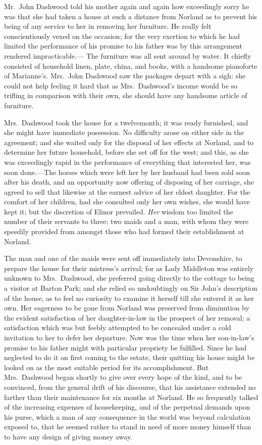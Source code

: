 \documentclass{article}
\begin{document}
Mr.\ John Dashwood told his mother again and again
how exceedingly sorry he was that she had taken a house at
such a distance from Norland as to prevent his being of any
service to her in removing her furniture.  He really felt
conscientiously vexed on the occasion; for the very exertion
to which he had limited the performance of his promise to
his father was by this arrangement rendered impracticable.---%
The furniture was all sent around by water.  It chiefly
consisted of household linen, plate, china, and books,
with a handsome pianoforte of Marianne's.  Mrs.\ John
Dashwood saw the packages depart with a sigh: she could
not help feeling it hard that as Mrs.\ Dashwood's income
would be so trifling in comparison with their own,
she should have any handsome article of furniture.

Mrs.\ Dashwood took the house for a twelvemonth; it was
ready furnished, and she might have immediate possession.
No difficulty arose on either side in the agreement; and she
waited only for the disposal of her effects at Norland,
and to determine her future household, before she set
off for the west; and this, as she was exceedingly rapid
in the performance of everything that interested her,
was soon done.---The horses which were left her by her husband
had been sold soon after his death, and an opportunity
now offering of disposing of her carriage, she agreed
to sell that likewise at the earnest advice of her
eldest daughter.  For the comfort of her children, had she
consulted only her own wishes, she would have kept it;
but the discretion of Elinor prevailed.  \emph{Her} wisdom
too limited the number of their servants to three;
two maids and a man, with whom they were speedily provided
from amongst those who had formed their establishment
at Norland.

The man and one of the maids were sent off immediately
into Devonshire, to prepare the house for their mistress's
arrival; for as Lady Middleton was entirely unknown
to Mrs.\ Dashwood, she preferred going directly to the
cottage to being a visitor at Barton Park; and she relied
so undoubtingly on Sir John's description of the house,
as to feel no curiosity to examine it herself till she
entered it as her own.  Her eagerness to be gone from Norland
was preserved from diminution by the evident satisfaction
of her daughter-in-law in the prospect of her removal;
a satisfaction which was but feebly attempted to be concealed
under a cold invitation to her to defer her departure.
Now was the time when her son-in-law's promise to his
father might with particular propriety be fulfilled.
Since he had neglected to do it on first coming to
the estate, their quitting his house might be looked
on as the most suitable period for its accomplishment.
But Mrs.\ Dashwood began shortly to give over every
hope of the kind, and to be convinced, from the general
drift of his discourse, that his assistance extended no
farther than their maintenance for six months at Norland.
He so frequently talked of the increasing expenses
of housekeeping, and of the perpetual demands upon his purse,
which a man of any consequence in the world was beyond
calculation exposed to, that he seemed rather to stand
in need of more money himself than to have any design of
giving money away.
\end{document}

